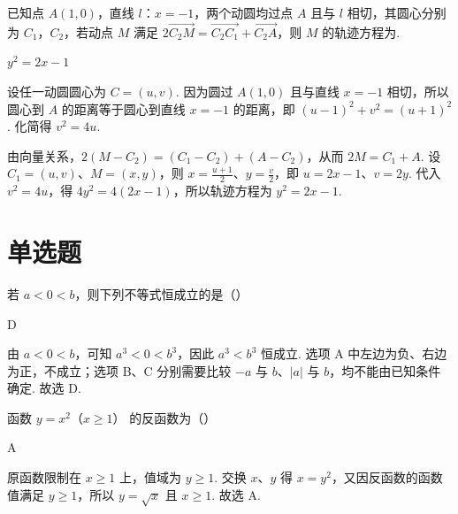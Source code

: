 \begin{problem}
已知点 \( A(1,0) \)，直线 \(l\)：\(x=-1\)，两个动圆均过点 \(A\) 且与 \(l\) 相切，其圆心分别为 \(C_1\)，\(C_2\)，若动点 \(M\) 满足 \( 2\overrightarrow{C_2M} = \overrightarrow{C_2C_1} + \overrightarrow{C_2A} \)，则 \(M\) 的轨迹方程为\fillinblank{}.

\begin{answer}
\(y^2=2x-1\)
\end{answer}

\begin{solution}
设任一动圆圆心为 \(C=(u,v)\). 因为圆过 \(A(1,0)\) 且与直线 \(x=-1\) 相切，所以圆心到 \(A\) 的距离等于圆心到直线 \(x=-1\) 的距离，即 \((u-1)^2+v^2=(u+1)^2\). 化简得 \(v^2=4u\).

由向量关系，\(2(M-C_2)=(C_1-C_2)+(A-C_2)\)，从而 \(2M=C_1+A\). 设 \(C_1=(u,v)\)、\(M=(x,y)\)，则 \(x=\frac{u+1}{2}\)、\(y=\frac v2\)，即 \(u=2x-1\)、\(v=2y\). 代入 \(v^2=4u\)，得 \(4y^2=4(2x-1)\)，所以轨迹方程为 \(y^2=2x-1\).
\end{solution}
\end{problem}

\section{单选题}

\begin{problem}
若 \( a < 0 < b \)，则下列不等式恒成立的是（\quad）


\begin{answer}
D
\end{answer}

\begin{solution}
由 \(a<0<b\)，可知 \(a^3<0<b^3\)，因此 \(a^3<b^3\) 恒成立. 选项 A 中左边为负、右边为正，不成立；选项 B、C 分别需要比较 \(-a\) 与 \(b\)、\(|a|\) 与 \(b\)，均不能由已知条件确定. 故选 D.
\end{solution}
\end{problem}

\begin{problem}
函数 \( y = x^{2} \)（\( x \geq 1 \)） 的反函数为（\quad）


\begin{answer}
A
\end{answer}

\begin{solution}
原函数限制在 \(x\geq1\) 上，值域为 \(y\geq1\). 交换 \(x\)、\(y\) 得 \(x=y^2\)，又因反函数的函数值满足 \(y\geq1\)，所以 \(y=\sqrt{x}\) 且 \(x\geq1\). 故选 A.
\end{solution}
\end{problem}


